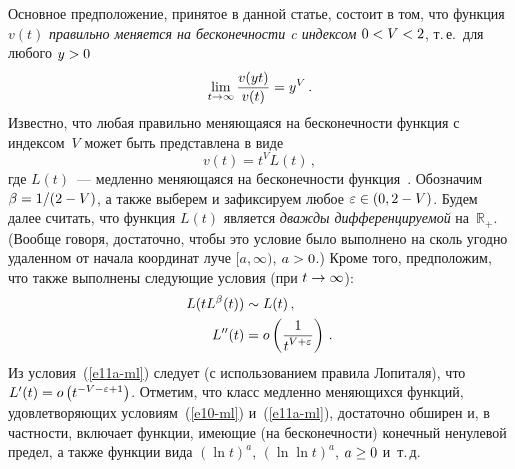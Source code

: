 \begin{multicols}{2}
Основное предположение, принятое в данной статье, состоит в том, что
функция~$v(t)$ {\it правильно меняется  на бесконечности c
индексом} $0\hm<V\hm<2$, т.\,е.\ для любого $y\hm>0$
$$
\lim\limits_{t \to \infty} \displaystyle\frac{\displaystyle v(yt) \mathstrut}{\displaystyle v(t)\mathstrut}=y^V\,.
$$
Известно,  что любая правильно меняющаяся на бесконечности функция
с индексом~$V$ может быть представлена в виде
\begin{equation*}
v(t)=t^V L(t)\,,
\end{equation*}
где $L(t)$~--- медленно меняющаяся на беско\-неч\-ности функция~\cite{Seneta}. 
Обозначим $\beta\hm={1}/(2-V)$, а также выберем и
зафиксируем любое $\varepsilon \hm\in (0,2-V)$. Будем далее считать,
что функция $L(t)$ является {\it дважды дифференцируемой} на~$\mathbb{R}_+$. 
(Вообще говоря, достаточно, чтобы это условие было
выполнено  на сколь угодно удаленном от начала координат луче
$[a,\infty)$, $a\hm>0$.) Кроме того, предположим, что также
выполнены следующие условия (при $t \hm\to \infty$):
\begin{align}
L(tL^\beta(t))& \sim L(t)\,,\label{e10-ml}\\
L''(t)&=o\left( \displaystyle\frac{\displaystyle 1\mathstrut}{\displaystyle t^{V+\varepsilon}\mathstrut} \right)\,.\label{e11a-ml}
\end{align}
Из условия~(\ref{e11a-ml}) следует (с использованием правила Лопиталя),
что $L'(t)\hm=o\left(t^{-V-\varepsilon+1} \right)$. Отметим, что класс
медленно меняющихся функций, удовлетворяющих условиям~(\ref{e10-ml}) и~(\ref{e11a-ml}), 
достаточно обширен и, в частности, включает функции,
имеющие (на бесконечности) конечный ненулевой предел, а также
функции вида $(\ln t)^a$, $(\ln\ln t)^a$, $a\hm\ge 0$ и~т.\,д.


\end{multicols}
